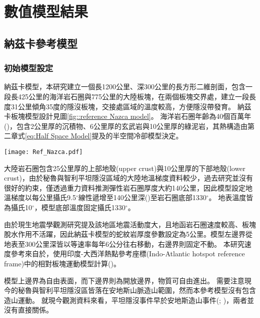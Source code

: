 
\chapter{數值模型結果}

\section{納茲卡參考模型}
\subsection{初始模型設定}
納茲卡模型，本研究建立一個長1200公里、深300公里的長方形二維剖面，包含一段長425公里的海洋岩石圈與775公里的大陸板塊，在兩個板塊交界處，建立一段長度31公里傾角35度的隱沒板塊，交接處區域的溫度較高，方便隱沒帶發育。
納茲卡板塊模型設計見圖\ref{fig::reference Nazca model}。
海洋岩石圈年齡為40個百萬年(\citealp{muller2019})，包含2公里厚的沉積物、6公里厚的玄武岩與10公里厚的綠泥岩，其熱構造由第二章式\ref{eq:Half Space Model}提及的半空間冷卻模型決定。

\begin{figure*}[hb]
    \centering
    \texttt{[image: Ref\_Nazca.pdf]}
    \caption[納茲卡板塊隱沒模型設計與邊界條件示意圖]{納茲卡板塊隱沒模型設計與邊界條件示意圖}
    \label{fig::reference Nazca model}
\end{figure*}

大陸岩石圈包含25公里厚的上部地殼(upper crust)與10公里厚的下部地殼(lower crust)，由於秘魯與智利平坦隱沒區域的大陸地溫梯度資料較少，過去研究並沒有很好的約束，僅透過重力資料推測彈性岩石圈厚度大約140公里，因此模型設定地溫梯度以每公里攝氏9.5$^{\circ}$線性遞增至140公里深(\citealp{perez2008})至岩石圈底部1330$^{\circ}$。
地表溫度皆為攝氏10$^{\circ}$，模型底部溫度固定攝氏1330$^{\circ}$。

由於現生地震學觀測研究提及該地區地震活動度大，且地函岩石圈速度較高、板塊脫水作用不活躍，因此納茲卡模型的蛇紋岩厚度參數設定為5公里。模型左邊界從地表至300公里深皆以等速率每年6公分往右移動，右邊界則固定不動。
本研究速度參考來自於\citealp{o2005uncertainties}，使用印度-大西洋熱點參考座標(Indo-Atlantic hotspot reference frame)中的相對板塊運動模型計算(\citealp{schellart2008global})。

模型上邊界為自由表面，而下邊界則為開放邊界，物質可自由進出。
需要注意現今的秘魯與智利平坦隱沒區皆落在安地斯山脈造山範圍，然而本參考模型沒有包含造山運動。
就現今觀測資料來看，平坦隱沒事件早於安地斯造山事件(\citealp{chen2019southward}; \citealp{hu2021southward})，兩者並沒有直接關係。


